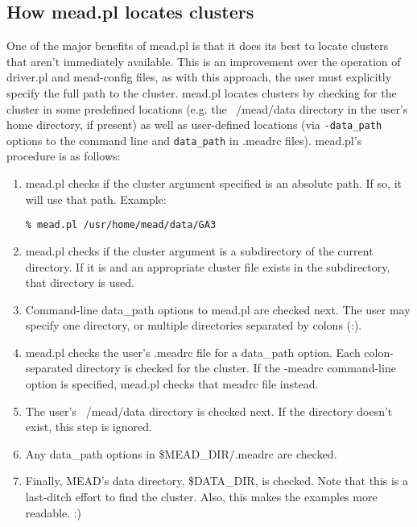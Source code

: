 \documentclass[10pt]{article}
\begin{document}
\subsection{How mead.pl locates clusters}

One of the major benefits of mead.pl is that it does its best to
locate clusters that aren't immediately available.  This is an 
improvement over the operation of driver.pl and mead-config
files, as with this approach, the user must explicitly specify 
the full path to the cluster.   mead.pl locates clusters
by checking for the cluster in some predefined locations 
(e.g. the ~/mead/data directory in the user's home directory, 
if present) as well as user-defined locations 
(via \verb|-data_path| options to the command line and 
\verb|data_path| in .meadrc files).
mead.pl's procedure is as follows:

\begin{enumerate}

\item mead.pl checks if the cluster argument specified is an 
absolute path.  If so, it will use that path.  Example:

  \verb|% mead.pl /usr/home/mead/data/GA3|

\item mead.pl checks if the cluster argument is a subdirectory
of the current directory.  If it is and an appropriate cluster
file exists in the subdirectory, that directory is used.

\item Command-line data\_path options to mead.pl are checked 
next.  The user may specify one directory, or multiple
directories separated by colons (:).

\item mead.pl checks the user's .meadrc file for a data\_path
option.  Each colon-separated directory is checked for the cluster.
If the -meadrc command-line option is specified, mead.pl 
checks that meadrc file instead.

\item The user's ~/mead/data directory is checked next.  If the
directory doesn't exist, this step is ignored.

\item Any data\_path options in \$MEAD\_DIR/.meadrc are checked.

\item Finally, MEAD's data directory, \$DATA\_DIR, is checked.
Note that this is a last-ditch effort to find the cluster.  Also,
this makes the examples more readable. :)

\end{enumerate}
\end{document}
